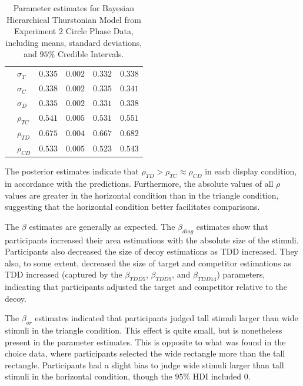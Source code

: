 \begin{table}[ht]
\begin{tabular}{llrrrr}
                    &  $\sigma_{T}$    &    $0.335$   &   $0.002$   &  $0.332$     & $0.338$     \\
                    &  $\sigma_{C}$    &    $0.338$   &   $0.002$   &  $0.335$     & $0.341$     \\
                    &  $\sigma_{D}$    &    $0.335$   &   $0.002$   &  $0.331$     & $0.338$     \\
                    &  $\rho_{TC}$     &    $0.541$   &   $0.005$   &  $0.531$     & $0.551$     \\
                    &  $\rho_{TD}$     &    $0.675$   &   $0.004$   &  $0.667$     & $0.682$     \\
                    &  $\rho_{CD}$     &    $0.533$   &   $0.005$   &  $0.523$     & $0.543$     \\
        \bottomrule
    \end{tabular}
    \caption{Parameter estimates for Bayesian Hierarchical Thurstonian Model from Experiment 2 Circle Phase Data, including means, standard deviations, and $95\%$ Credible Intervals.}
    \label{tab:e2_params}
\end{table}

The posterior estimates indicate that $\rho_{TD}>\rho_{TC}\approx\rho_{CD}$ in each display condition, in accordance with the predictions. Furthermore, the absolute values of all $\rho$ values are greater in the horizontal condition than in the triangle condition, suggesting that the horizontal condition better facilitates comparisons. 

The $\beta$ estimates are generally as expected. The $\beta_{diag}$ estimates show that participants increased their area estimations with the absolute size of the stimuli. Participants also decreased the size of decoy estimations as TDD increased. They also, to some extent, decreased the size of target and competitor estimations as TDD increased (captured by the $\beta_{TDD5}$, $\beta_{TDD9}$, and $\beta_{TDD14}$) parameters, indicating that participants adjusted the target and competitor relative to the decoy.

The $\beta_{or}$ estimates indicated that participants judged tall stimuli larger than wide stimuli in the triangle condition. This effect is quite small, but is nonetheless present in the parameter estimates. This is opposite to what was found in the choice data, where participants selected the wide rectangle more than the tall rectangle. Participants had a slight bias to judge wide stimuli larger than tall stimuli in the horizontal condition, though the $95\%$ HDI included 0.

